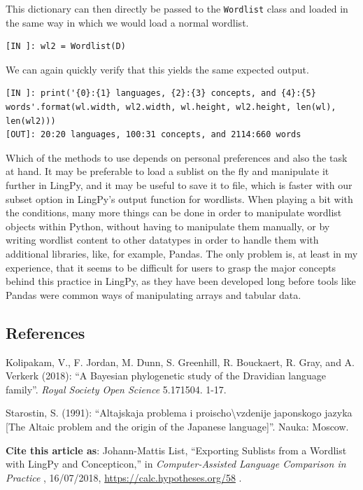 \documentclass[
  english,
  a4paper,
  oneside,tablecaptionabove
]{scrbook}
\newcommand{\passthrough}[1]{#1}
\begin{document}
This dictionary can then directly be passed to the
\passthrough{\lstinline!Wordlist!} class and loaded in the same way in
which we would load a normal wordlist.

\begin{lstlisting}
[IN ]: wl2 = Wordlist(D)
\end{lstlisting}

We can again quickly verify that this yields the same expected output.

\begin{lstlisting}
[IN ]: print('{0}:{1} languages, {2}:{3} concepts, and {4}:{5} words'.format(wl.width, wl2.width, wl.height, wl2.height, len(wl), len(wl2))) 
[OUT]: 20:20 languages, 100:31 concepts, and 2114:660 words
\end{lstlisting}

Which of the methods to use depends on personal preferences and also the
task at hand. It may be preferable to load a sublist on the fly and
manipulate it further in LingPy, and it may be useful to save it to
file, which is faster with our subset option in LingPy's output function
for wordlists. When playing a bit with the conditions, many more things
can be done in order to manipulate wordlist objects within Python,
without having to manipulate them manually, or by writing wordlist
content to other datatypes in order to handle them with additional
libraries, like, for example, Pandas. The only problem is, at least in
my experience, that it seems to be difficult for users to grasp the
major concepts behind this practice in LingPy, as they have been
developed long before tools like Pandas were common ways of manipulating
arrays and tabular data.

\hypertarget{references}{\subsection*{References}\label{references}}

Kolipakam, V., F. Jordan, M. Dunn, S. Greenhill, R. Bouckaert, R.
Gray, and A. Verkerk (2018): ``A Bayesian phylogenetic study of
the Dravidian language family''. \emph{Royal Society Open Science}
5.171504. 1-17.

Starostin, S. (1991): ``Altajskaja problema i
proischo\textbackslash{}vzdenije japonskogo jazyka {[}The Altaic problem
and the origin of the Japanese language{]}''. Nauka: Moscow.

\textbf{Cite this article as}: Johann-Mattis List, ``Exporting Sublists
from a Wordlist with LingPy and Concepticon,'' in \emph{Computer-Assisted
Language Comparison in Practice} , 16/07/2018,
\url{https://calc.hypotheses.org/58} .
\end{document}
